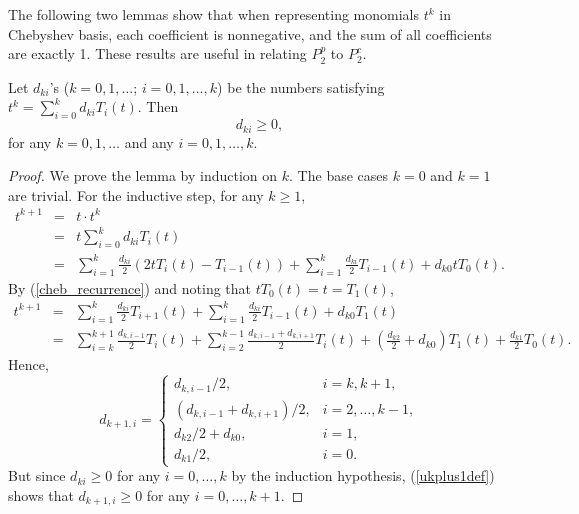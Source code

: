 \documentclass[12pt]{article}
\begin{document}
The following two lemmas show that when representing monomials
$t^k$ in Chebyshev basis, each coefficient is nonnegative, and the
sum of all coefficients are exactly 1.  These results are useful
in relating $P_2^p$ to $P_2^c$.

\begin{lemma}
\label{lem_nonnegu} Let $d_{ki}$'s ($k = 0,1,\ldots$; $i =
0,1,\ldots, k$) be the numbers satisfying $t^k = \sum_{i=0}^k
d_{ki}T_i(t)$.  Then
\[
d_{ki} \geq 0,
\]
for any $k = 0,1,\ldots$ and any $i = 0,1,\ldots, k$.
\begin{proof}
We prove the lemma by induction on $k$.  The base cases $k=0$ and
$k=1$ are trivial.  For the inductive step, for any $k \geq 1$,
\begin{eqnarray}
t^{k+1} & = & t \cdot t^k \nonumber \\
& = & t \sum_{i=0}^k d_{ki} T_i(t) \nonumber \\
& = & \sum_{i=1}^k \frac{d_{ki}}{2} \left(2tT_i(t)-T_{i-1}(t)
\right)+ \sum_{i=1}^k \frac{d_{ki}}{2}T_{i-1}(t) + d_{k0}tT_0(t).
\nonumber
\end{eqnarray}
By (\ref{cheb_recurrence}) and noting that $tT_0(t) = t = T_1(t)$,
\begin{eqnarray}
t^{k+1} & = & \sum_{i=1}^k \frac{d_{ki}}{2}T_{i+1}(t)+
\sum_{i=1}^k
\frac{d_{ki}}{2}T_{i-1}(t) + d_{k0}T_1(t)  \nonumber \\
& = & \sum_{i=k}^{k+1}\frac{d_{k,i-1}}{2}T_{i}(t) +
\sum_{i=2}^{k-1} \frac{d_{k,i-1}+d_{k,i+1}}{2}T_i(t) +
\left(\frac{d_{k2}}{2}+d_{k0}\right)T_1(t) +
\frac{d_{k1}}{2}T_0(t). \nonumber
\end{eqnarray}
Hence,
\begin{equation}
d_{k+1,i} = \left\{\begin{array}{ll} d_{k,i-1}/2, &
i=k,k+1, \\
\left(d_{k,i-1}+d_{k,i+1}\right)/2, & i=2,\ldots,k-1, \\
d_{k2}/2+d_{k0},& i=1, \\
d_{k1}/2,& i = 0. \end{array} \right. \label{ukplus1def}
\end{equation}
But since $d_{ki} \geq 0$ for any $i=0,\ldots,k$ by the induction
hypothesis, (\ref{ukplus1def}) shows that $d_{k+1,i} \geq 0$ for
any $i=0,\ldots,k+1$.
\end{proof}
\end{lemma}
\end{document}
